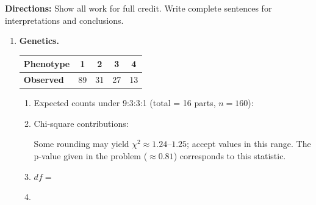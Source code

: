 \documentclass[10pt]{article}
\begin{document}
\namedateperiod

\vspace{0.1in}
\textbf{Directions:} Show all work for full credit. Write complete sentences for
interpretations and conclusions.

\begin{enumerate}

  \item \textbf{Genetics.}

        \renewcommand{\arraystretch}{1.4}
        \begin{center}
        \begin{tabular}{lcccc}
            \textbf{Phenotype} & 1  & 2  & 3  & 4  \\
            \hline
            \textbf{Observed}  & 89 & 31 & 27 & 13 \\
        \end{tabular}
        \end{center}

        \begin{enumerate}[label=\alph*.]
          \item Expected counts under 9:3:3:1 (total = 16 parts, $n = 160$):

          \item Chi-square contributions:

                \begin{teachernote}
                    Some rounding may yield $\chi^2 \approx 1.24$--$1.25$; accept values in this range.
                    The p-value given in the problem ($\approx 0.81$) corresponds to this statistic.
                \end{teachernote}

          \item $df =$ 

          \item {}
        \end{enumerate}


\end{enumerate}
\end{document}
